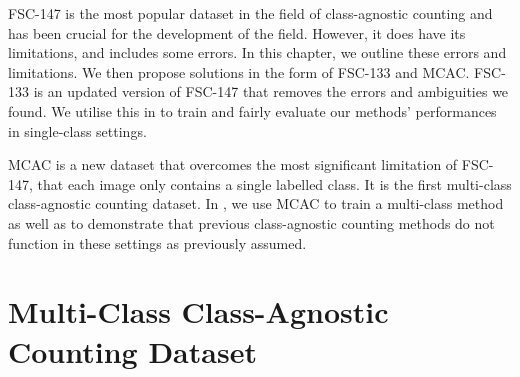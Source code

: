 FSC-147  \cite{ranjan2021Famnet} is the most popular dataset in the field of class-agnostic counting and has been crucial for the development of the field.
However, it does have its limitations, and includes some errors.
In this chapter, we outline these errors and limitations. We then propose solutions in the form of FSC-133 and MCAC.
FSC-133 is an updated version of FSC-147 that removes the errors and ambiguities we found. We utilise this in  to train and fairly evaluate our methods' performances in single-class settings.

MCAC is a new dataset that overcomes the most significant limitation of FSC-147, that each image only contains a single labelled class.
It is the first multi-class class-agnostic counting dataset.
In , we use MCAC to train a multi-class method as well as to demonstrate that previous class-agnostic counting methods do not function in these settings as previously assumed.


\section{Multi-Class Class-Agnostic Counting Dataset}
\label{sec__MCAC}
